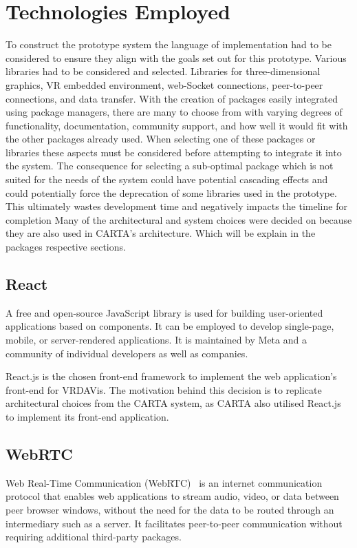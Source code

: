 \section{Technologies Employed}
\label{sec:technologies-employed}
To construct the prototype system the language of implementation had to be considered to ensure they align with the goals set out for this prototype.
Various libraries had to be considered and selected.
Libraries for three-dimensional graphics, VR embedded environment, web-Socket connections, peer-to-peer connections, and data transfer.
With the creation of packages easily integrated using package managers, there are many to choose from with varying degrees of functionality, documentation, community support, and how well it would fit with the other packages already used.
When selecting one of these packages or libraries these aspects must be considered before attempting to integrate it into the system.
The consequence for selecting a sub-optimal package which is not suited for the needs of the system could have potential cascading effects and could potentially force the deprecation of some libraries used in the prototype.
This ultimately wastes development time and negatively impacts the timeline for completion
Many of the architectural and system choices were decided on because they are also used in CARTA's architecture.
Which will be explain in the packages respective sections.

\subsection{React}
A free and open-source JavaScript library is used for building user-oriented applications based on components. It can be employed to develop single-page, mobile, or server-rendered applications. It is maintained by Meta and a community of individual developers as well as companies.

React.js is the chosen front-end framework to implement the web application's front-end for VRDAVis. The motivation behind this decision is to replicate architectural choices from the CARTA system, as CARTA also utilised React.js to implement its front-end application.

\subsection{WebRTC}
Web Real-Time Communication (WebRTC)~\cite{Blum2021} is an internet communication protocol that enables web applications to stream audio, video, or data between peer browser windows, without the need for the data to be routed through an intermediary such as a server. It facilitates peer-to-peer communication without requiring additional third-party packages.

